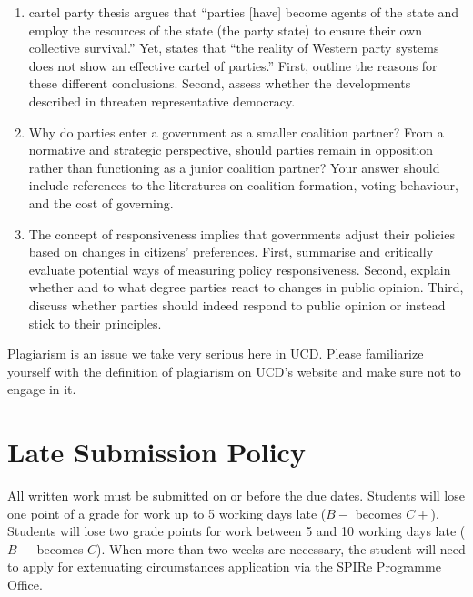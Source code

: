 \documentclass[abstract=on,parskip=full,headings=standardclasses,fontsize=11pt,paper=a4]{scrartcl}
\begin{document}
\begin{enumerate}
\item {} cartel party thesis argues that ``parties [have] become agents of the state and employ the resources of the state (the party state) to ensure their own collective survival.'' Yet, \textcite[507]{koole96} states that ``the reality of Western party systems does not show an effective cartel of parties.'' First, outline the reasons for these different conclusions. Second, assess whether the developments described in \textcite{katz95} threaten representative democracy.

\item  Why do parties enter a government as a smaller coalition partner? From a normative and strategic perspective, should parties remain in opposition rather than functioning as a junior coalition partner? Your answer should include references to the literatures on coalition formation, voting behaviour, and the cost of governing.

\item The concept of responsiveness implies that governments adjust their policies based on changes in citizens' preferences. First, summarise and critically evaluate potential ways of measuring policy responsiveness. Second, explain whether and to what degree parties react to changes in public opinion. Third, discuss whether parties should indeed respond to public opinion or instead stick to their principles.

\end{enumerate}


Plagiarism is an issue we take very serious here in UCD. Please familiarize yourself with the definition of plagiarism on UCD's website and make sure not to engage in it.





\section*{Late Submission Policy}

All written work must be submitted on or before the due dates. Students will lose one point of a grade for work up to 5 working days late ($B-$ becomes $C+$). Students will lose two grade points for work between 5 and 10 working days late ($B-$ becomes $C$). When more than two weeks are necessary, the student will need to apply for extenuating circumstances application via the SPIRe Programme Office.
\end{document}
